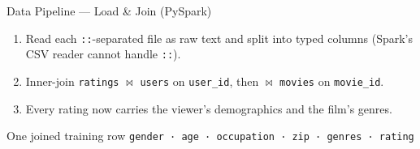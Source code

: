\documentclass[aspectratio=169]{beamer}
\begin{document}
\begin{frame}{Data Pipeline --- Load \& Join (PySpark)}
\begin{enumerate}
  \item Read each \texttt{::}-separated file as raw text and split into typed columns (Spark's CSV reader cannot handle \texttt{::}).
  \item Inner-join \texttt{ratings} $\bowtie$ \texttt{users} on \texttt{user\_id}, then $\bowtie$ \texttt{movies} on \texttt{movie\_id}.
  \item Every rating now carries the viewer's demographics and the film's genres.
\end{enumerate}

\vspace{0.3cm}

\begin{block}{One joined training row}
\texttt{gender · age · occupation · zip · genres · rating}
\end{block}
\end{frame}
\end{document}

